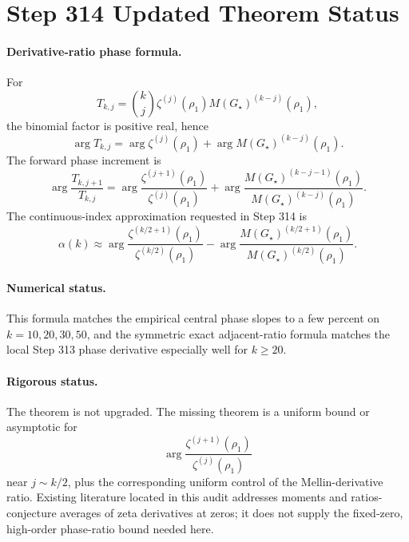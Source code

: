 \section*{Step 314 Updated Theorem Status}

\paragraph{Derivative-ratio phase formula.}
For
\[
T_{k,j}={k\choose j}\zeta^{(j)}(\rho_1)M(G_\star)^{(k-j)}(\rho_1),
\]
the binomial factor is positive real, hence
\[
\arg T_{k,j}
=
\arg\zeta^{(j)}(\rho_1)
+
\arg M(G_\star)^{(k-j)}(\rho_1).
\]
The forward phase increment is
\[
\arg\frac{T_{k,j+1}}{T_{k,j}}
=
\arg\frac{\zeta^{(j+1)}(\rho_1)}{\zeta^{(j)}(\rho_1)}
+
\arg\frac{M(G_\star)^{(k-j-1)}(\rho_1)}
        {M(G_\star)^{(k-j)}(\rho_1)}.
\]
The continuous-index approximation requested in Step 314 is
\[
\alpha(k)\approx
\arg\frac{\zeta^{(k/2+1)}(\rho_1)}{\zeta^{(k/2)}(\rho_1)}
-
\arg\frac{M(G_\star)^{(k/2+1)}(\rho_1)}
        {M(G_\star)^{(k/2)}(\rho_1)}.
\]

\paragraph{Numerical status.}
This formula matches the empirical central phase slopes to a few percent
on \(k=10,20,30,50\), and the symmetric exact adjacent-ratio formula
matches the local Step 313 phase derivative especially well for
\(k\ge20\).

\paragraph{Rigorous status.}
The theorem is not upgraded.  The missing theorem is a uniform bound or
asymptotic for
\[
\arg\frac{\zeta^{(j+1)}(\rho_1)}{\zeta^{(j)}(\rho_1)}
\]
near \(j\sim k/2\), plus the corresponding uniform control of the
Mellin-derivative ratio.  Existing literature located in this audit
addresses moments and ratios-conjecture averages of zeta derivatives at
zeros; it does not supply the fixed-zero, high-order phase-ratio bound
needed here.

